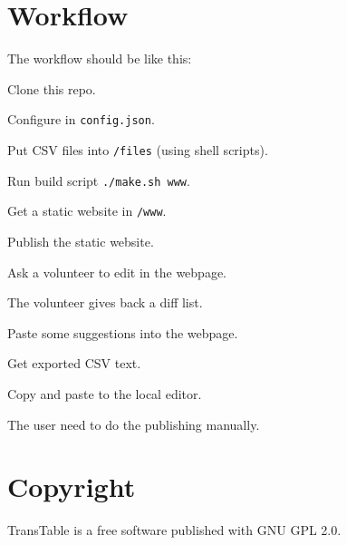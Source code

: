 \documentclass[11pt,a4paper]{report}
\begin{document}
\chapter{Workflow}

The workflow should be like this:
\begin{compactitem}
    \item Clone this repo.
    \item Configure in \texttt{config.json}.
    \item Put CSV files into \texttt{/files} (using shell scripts).
    \item Run build script \texttt{./make.sh www}.
    \item Get a static website in \texttt{/www}.
    \item Publish the static website.
    \item Ask a volunteer to edit in the webpage.
    \item The volunteer gives back a diff list.
    \item Paste some suggestions into the webpage.
    \item Get exported CSV text.
    \item Copy and paste to the local editor.
\end{compactitem}

The user need to do the publishing manually.







\chapter{Copyright}
TransTable is a free software published with GNU GPL 2.0.
\end{document}

